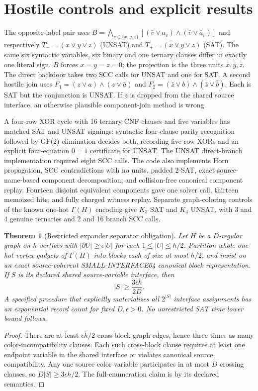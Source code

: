 \documentclass[11pt]{article}
\newtheorem{theorem}{Theorem}
\begin{document}
\section{Hostile controls and explicit results}
The opposite-label pair uses $B=\bigwedge_{v\in\{x,y,z\}}[(\bar v\vee a_v)\wedge(\bar v\vee\bar a_v)]$ and respectively $T_-=(x\vee y\vee z)$ (UNSAT) and $T_+=(\bar x\vee y\vee z)$ (SAT). The same six syntactic variables, six binary and one ternary clauses differ in exactly one literal sign. $B$ forces $x=y=z=0$; the projection is the three units $\bar x,\bar y,\bar z$. The direct backdoor takes two SCC calls for UNSAT and one for SAT. A second hostile join uses $F_1=(z\vee a)\wedge(z\vee\bar a)$ and $F_2=(\bar z\vee b)\wedge(\bar z\vee\bar b)$. Each is SAT but the conjunction is UNSAT. If $z$ is dropped from the shared source interface, an otherwise plausible component-join method is wrong.

A four-row XOR cycle with 16 ternary CNF clauses and five variables has matched SAT and UNSAT signings; syntactic four-clause parity recognition followed by GF(2) elimination decides both, recording five row XORs and an explicit four-equation $0=1$ certificate for UNSAT. The UNSAT direct-branch implementation required eight SCC calls. The code also implements Horn propagation, SCC contradictions with no units, padded 2-SAT, exact source-name-based component decomposition, and collision-free canonical component replay. Fourteen disjoint equivalent components gave one solver call, thirteen memoized hits, and fully charged witness replay. Separate graph-coloring controls of the known one-hot $\Gamma(H)$ encoding give $K_3$ SAT and $K_4$ UNSAT, with 3 and 4 genuine ternaries and 2 and 16 branch SCC calls.

\begin{theorem}[Restricted expander separator obligation]
Let $H$ be a $D$-regular graph on $h$ vertices with $|\partial U|\ge\epsilon|U|$ for each $1\le|U|\le h/2$. Partition whole one-hot vertex gadgets of $\Gamma(H)$ into blocks each of size at most $h/2$, and insist on an exact source-coherent SMALL-INTERFACE64 canonical block representation. If $S$ is its declared shared source-variable interface, then
\[
|S|\ge\frac{3\epsilon h}{2D}.
\]
A specified procedure that explicitly materializes \emph{all} $2^{|S|}$ interface assignments has an exponential record count for fixed $D,\epsilon>0$. No unrestricted SAT time lower bound follows.
\end{theorem}
\begin{proof}There are at least $\epsilon h/2$ cross-block graph edges, hence three times as many color-incompatibility clauses. Each such cross-block clause requires at least one endpoint variable in the shared interface or violates canonical source compatibility. Any one source color variable participates in at most $D$ crossing clauses, so $D|S|\ge 3\epsilon h/2$. The full-enumeration claim is by its declared semantics.\end{proof}
\end{document}
